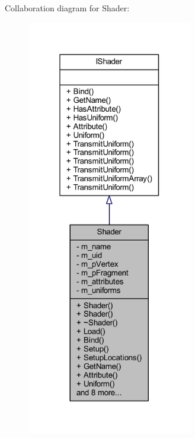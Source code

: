 Collaboration diagram for Shader\+:\nopagebreak
\begin{figure}[H]
\begin{center}
\leavevmode
\includegraphics[width=205pt]{class_shader__coll__graph}
\end{center}
\end{figure}

